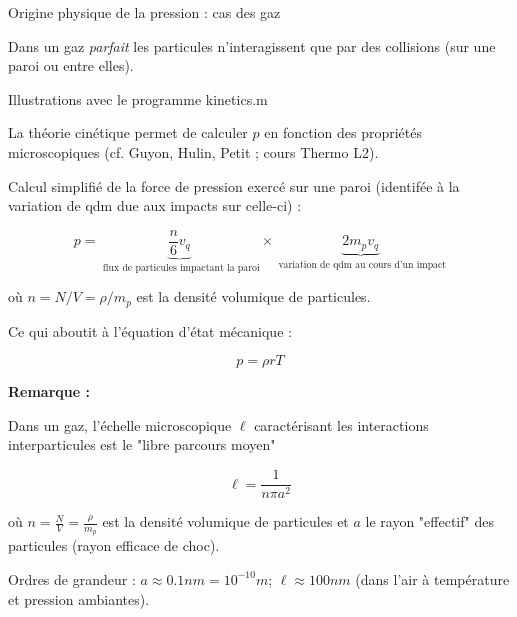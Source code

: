 \begin{frame} {Origine physique de la pression : cas des gaz}

\small 

Dans un gaz {\em parfait} les particules n'interagissent que par des collisions (sur une paroi ou entre elles).


\medskip

{\color{vert} Illustrations avec le programme kinetics.m}

\pause
\medskip 



La théorie cinétique permet de calculer $p$ en fonction des propriétés microscopiques (cf. Guyon, Hulin, Petit ; cours Thermo L2).

\medskip

Calcul simplifié de la force de pression exercé sur une paroi 
(identifée à la variation de qdm due aux impacts sur celle-ci) :


$$
p =   \underbrace{\frac{n}{6} v_q}_{\mbox{ flux de particules impactant la paroi}}  \times  \underbrace{ 2 m_p v_q}_{\mbox{ variation de qdm au cours d'un impact}}
$$

où $n=N/V = \rho/m_p$ est la densité volumique de particules.

Ce qui aboutit à l'équation d'état mécanique :

$$
p = \rho r T
$$

\smallskip





\pause
\bigskip

{\bf Remarque :} 

Dans un gaz, l'échelle microscopique $\ell$ caractérisant les interactions interparticules est le  "libre parcours moyen" 

$$\ell  = \frac{1}{n \pi a^2}  $$ 

où $n = \frac{N}{V} = \frac{\rho}{m_p}$ est la densité volumique de particules et $a$ le rayon "effectif" des particules (rayon efficace de choc).

Ordres de grandeur : $a \approx 0.1 nm = 10^{-10} m$; 
 $\ell \approx 100 nm $ (dans l'air à température et pression ambiantes).
 






\end{frame}

